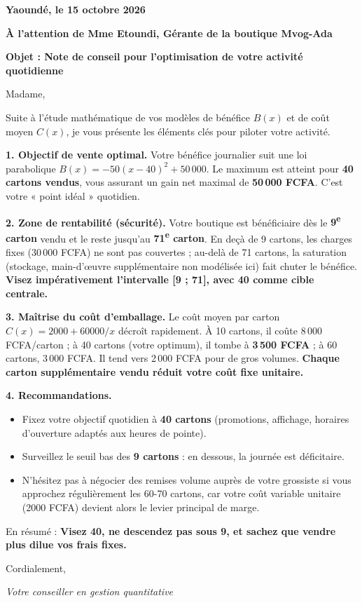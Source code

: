 \documentclass[11pt]{article}
\begin{document}
\begin{exoresolu}
\textbf{Yaoundé, le 15 octobre 2026}

\textbf{À l'attention de Mme Etoundi, Gérante de la boutique Mvog-Ada}

\textbf{Objet : Note de conseil pour l'optimisation de votre activité quotidienne}

Madame,

Suite à l'étude mathématique de vos modèles de bénéfice $B(x)$ et de coût moyen $C(x)$, je vous présente les éléments clés pour piloter votre activité.

\textbf{1. Objectif de vente optimal.}
Votre bénéfice journalier suit une loi parabolique $B(x) = -50(x-40)^2 + 50\,000$. Le maximum est atteint pour \textbf{40 cartons vendus}, vous assurant un gain net maximal de \textbf{50\,000 FCFA}. C'est votre « point idéal » quotidien.

\textbf{2. Zone de rentabilité (sécurité).}
Votre boutique est bénéficiaire dès le \textbf{9\textsuperscript{e} carton} vendu et le reste jusqu'au \textbf{71\textsuperscript{e} carton}. En deçà de 9 cartons, les charges fixes (30\,000 FCFA) ne sont pas couvertes ; au-delà de 71 cartons, la saturation (stockage, main-d'œuvre supplémentaire non modélisée ici) fait chuter le bénéfice. \textbf{Visez impérativement l'intervalle [9 ; 71], avec 40 comme cible centrale.}

\textbf{3. Maîtrise du coût d'emballage.}
Le coût moyen par carton $C(x) = 2000 + 60000/x$ décroît rapidement. À 10 cartons, il coûte 8\,000 FCFA/carton ; à 40 cartons (votre optimum), il tombe à \textbf{3\,500 FCFA} ; à 60 cartons, 3\,000 FCFA. Il tend vers 2\,000 FCFA pour de gros volumes. \textbf{Chaque carton supplémentaire vendu réduit votre coût fixe unitaire.}

\textbf{4. Recommandations.}
\begin{itemize}
    \item Fixez votre objectif quotidien à \textbf{40 cartons} (promotions, affichage, horaires d'ouverture adaptés aux heures de pointe).
    \item Surveillez le seuil bas des \textbf{9 cartons} : en dessous, la journée est déficitaire.
    \item N'hésitez pas à négocier des remises volume auprès de votre grossiste si vous approchez régulièrement les 60-70 cartons, car votre coût variable unitaire (2000 FCFA) devient alors le levier principal de marge.
\end{itemize}

En résumé : \textbf{Visez 40, ne descendez pas sous 9, et sachez que vendre plus dilue vos frais fixes.}

Cordialement,
\vspace{1cm}

\noindent \textit{Votre conseiller en gestion quantitative}
\end{exoresolu}
\end{document}

